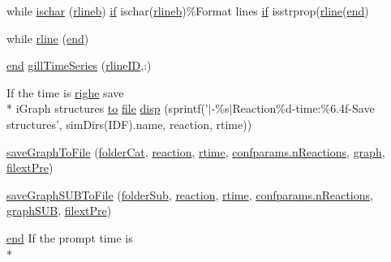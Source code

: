 \begin{DoxyCompactItemize}
\item 
while \hyperlink{a00028_aaa2ace52a161710427bdc25dd600089b}{ischar} (\hyperlink{a00028_a8df79027fd85d4a3668754f36e9e88c1}{rlineb}) \hyperlink{a00030_a01d55766b8058903dd360b4bda71f9f5}{if} ischar(\hyperlink{a00028_a8df79027fd85d4a3668754f36e9e88c1}{rlineb})\%Format lines \hyperlink{a00030_a01d55766b8058903dd360b4bda71f9f5}{if} isstrprop(\hyperlink{a00028_ab5b947e1a8b7cf496ffd4eb21317052e}{rline}(\hyperlink{a00025_afb358f48b1646c750fb9da6c6585be2b}{end})
\item 
while \hyperlink{a00028_ab5b947e1a8b7cf496ffd4eb21317052e}{rline} (\hyperlink{a00025_afb358f48b1646c750fb9da6c6585be2b}{end})
\item 
\hyperlink{a00025_afb358f48b1646c750fb9da6c6585be2b}{end} \hyperlink{a00028_ac62d9b6e4b7257c90322e20e1eb8e733}{gill\-Time\-Series} (\hyperlink{a00028_a8443a49765859a8631fed7e8a1d27fe5}{rline\-I\-D},\-:)
\item 
If the time is \hyperlink{a00108_abdf49e297e2c121f2d09f075ac3d518a}{righe} save \\*
i\-Graph structures \hyperlink{a00028_af71dbe52628a3f83a77ab494817525c6}{to} \hyperlink{a00110_a4e8353d6c62cf54bf4a1a8f63e56b8c3}{file} \hyperlink{a00028_afa2000dd097bd23eb8be232e0bdfeb4d}{disp} (sprintf('$|$-\/\%s$|$Reaction\%d-\/time\-:\%6.\-4f-\/\-Save structures', sim\-Dirs(\-I\-D\-F).\-name, reaction, rtime))
\item 
\hyperlink{a00028_ab80c851bb58475542f68e7585b2b1948}{save\-Graph\-To\-File} (\hyperlink{a00028_ac4793cb55101110d228ded89ce9caa48}{folder\-Cat}, \hyperlink{a00028_a4ba2ecb46f808729569ecce2cc1d34c6}{reaction}, \hyperlink{a00028_afc6b38657a313b9f1de2ee356910b6ee}{rtime}, \hyperlink{a00113_a8d704532b4b419f1428cb078bb5c7ffe}{confparams.\-n\-Reactions}, \hyperlink{a00028_a2745e24fec2a44d51f4452beb1596bd3}{graph}, \hyperlink{a00028_a527736a425f4f7ead2c2dc9d7b479346}{filext\-Pre})
\item 
\hyperlink{a00028_af8c5bdc8ca3fe8ddcc8594ecad80560a}{save\-Graph\-S\-U\-B\-To\-File} (\hyperlink{a00028_a05c5bf0305e5d58d4dc25bd89a025678}{folder\-Sub}, \hyperlink{a00028_a4ba2ecb46f808729569ecce2cc1d34c6}{reaction}, \hyperlink{a00028_afc6b38657a313b9f1de2ee356910b6ee}{rtime}, \hyperlink{a00113_a8d704532b4b419f1428cb078bb5c7ffe}{confparams.\-n\-Reactions}, \hyperlink{a00028_acd499d32ebba9c935bab9a19da7a174b}{graph\-S\-U\-B}, \hyperlink{a00028_a527736a425f4f7ead2c2dc9d7b479346}{filext\-Pre})
\item 
\hyperlink{a00025_afb358f48b1646c750fb9da6c6585be2b}{end} If the prompt time is \\*

\end{DoxyCompactItemize}
